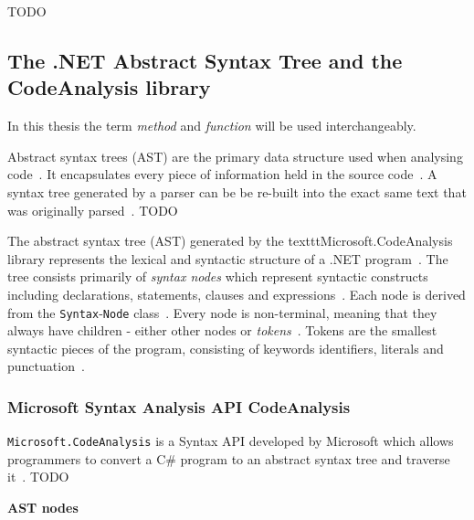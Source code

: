 \documentclass[a4paper,12pt]{article}
\begin{document}
TODO

\subsection{The .NET Abstract Syntax Tree and the CodeAnalysis library} \label{The .NET Abstract Syntax Tree and the CodeAnalysis library}

In this thesis the term \textit{method} and \textit{function} will be used interchangeably.

Abstract syntax trees (AST) are the primary data structure used when analysing code~\cite{microsoft-work-with-syntax}. It encapsulates every piece of information held in the source code~\cite{microsoft-work-with-syntax}. A syntax tree generated by a parser can be be re-built into the exact same text that was originally parsed~\cite{microsoft-work-with-syntax}. TODO

The abstract syntax tree (AST) generated by the texttt{Microsoft.CodeAnalysis} library represents the lexical and syntactic structure of a .NET program~\cite{microsoft-work-with-syntax}. The tree consists primarily of \textit{syntax nodes} which represent syntactic constructs including declarations, statements, clauses and expressions~\cite{microsoft-work-with-syntax}. Each node is derived from the \texttt{Syntax}-\texttt{Node} class~\cite{microsoft-work-with-syntax}. Every node is non-terminal, meaning that they always have children - either other nodes or \textit{tokens}~\cite{microsoft-work-with-syntax}. Tokens are the smallest syntactic pieces of the program, consisting of keywords identifiers, literals and punctuation~\cite{microsoft-work-with-syntax}.


\subsubsection{Microsoft Syntax Analysis API CodeAnalysis} \label{ssub:Microsoft Syntax Analysis API}
\texttt{Microsoft.CodeAnalysis} is a Syntax API developed by Microsoft which allows programmers to convert a C\# program to an abstract syntax tree and traverse it~\cite{microsoft-syntax-API}. TODO

\textbf{AST nodes}
\end{document}
